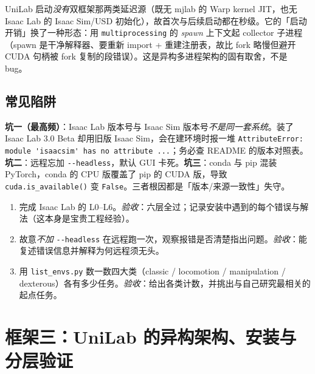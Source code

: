 \begin{finenote}
UniLab 启动\emph{没有}双框架那两类延迟源（既无 mjlab 的 Warp kernel JIT，也无 Isaac Lab 的 Isaac Sim/USD 初始化），故首次与后续启动都在秒级。它的「启动开销」换了一种形态：用 \texttt{multiprocessing} 的 \emph{spawn} 上下文起 collector 子进程（spawn 是干净解释器、要重新 import + 重建注册表，故比 fork 略慢但避开 CUDA 句柄被 fork 复制的段错误）。这是异构多进程架构的固有取舍，不是 bug。
\end{finenote}

\subsection{常见陷阱}

\begin{pitfall}
\textbf{坑一（最高频）}：Isaac Lab 版本号与 Isaac Sim 版本号\emph{不是同一套系统}。装了 Isaac Lab 3.0 Beta 却用旧版 Isaac Sim，会在建环境时报一堆 \verb|AttributeError: module 'isaacsim' has no attribute ...|；务必查 README 的版本对照表。\textbf{坑二}：远程忘加 \verb|--headless|，默认 GUI 卡死。\textbf{坑三}：conda 与 pip 混装 PyTorch，conda 的 CPU 版覆盖了 pip 的 CUDA 版，导致 \verb|cuda.is_available()| 变 \verb|False|。三者根因都是「版本/来源一致性」失守。
\end{pitfall}

\begin{practice}
\begin{enumerate}
  \item 完成 Isaac Lab 的 L0--L6。\emph{验收}：六层全过；记录安装中遇到的每个错误与解法（这本身是宝贵工程经验）。
  \item 故意\emph{不加} \verb|--headless| 在远程跑一次，观察报错是否清楚指出问题。\emph{验收}：能复述错误信息并解释为何远程须无头。
  \item 用 \verb|list_envs.py| 数一数四大类（classic / locomotion / manipulation / dexterous）各有多少任务。\emph{验收}：给出各类计数，并挑出与自己研究最相关的起点任务。
\end{enumerate}
\end{practice}

\section{框架三：UniLab 的异构架构、安装与分层验证}
\label{sec:rlmc-setup-unilab}

